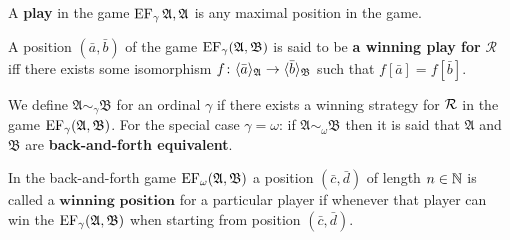 \begin{dfn}[Play]
	A \textbf{play} in the game $\operatorname{EF}_\gamma{\mathfrak{A},\mathfrak{A}}$ is any maximal position in the game.
\end{dfn}

\begin{dfn}
	A position $(\bar{a},\bar{b})$ of the game $\operatorname{EF}_\gamma(\mathfrak{A},\mathfrak{B})$ is said to be \textbf{a winning play for} $\bm{\mathcal{R}}$ iff there exists some isomorphism $f\colon\langle \bar{a}\rangle_{\mathfrak{A}}\to\langle \bar{b}\rangle_{\mathfrak{B}}$ such that $f[\bar{a}]=f[\bar{b}]$.
\end{dfn}

\begin{dfn}
	We define $\mathfrak{A}\sim_\gamma\mathfrak{B}$ for an ordinal $\gamma$ if there exists a winning strategy for $\mathcal{R}$ in the game $\operatorname{EF}_\gamma(\mathfrak{A},\mathfrak{B})$.  For the special case $\gamma=\omega$: if $\mathfrak{A}\sim_\omega\mathfrak{B}$ then it is said that $\mathfrak{A}$ and $\mathfrak{B}$ are \textbf{back-and-forth equivalent}.
\end{dfn}

\begin{dfn}
	In the back-and-forth game $\operatorname{EF}_\omega(\mathfrak{A},\mathfrak{B})$ a position $(\bar{c},\bar{d})$ of length $n\in\mathbb{N}$ is called a $\textbf{winning position}$ for a particular player if whenever that player can win the $\operatorname{EF}_\gamma(\mathfrak{A},\mathfrak{B})$ when starting from position $(\bar{c},\bar{d})$.
\end{dfn}

